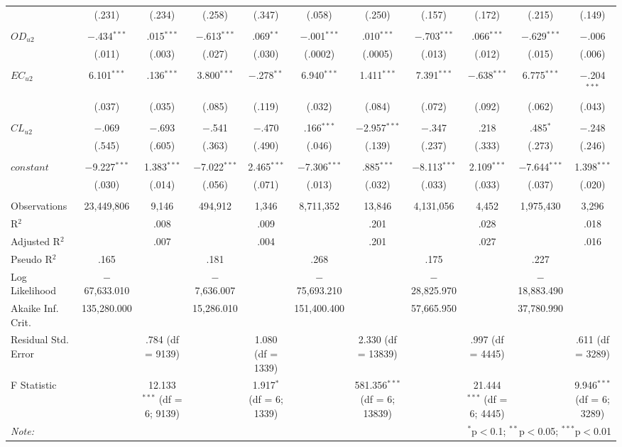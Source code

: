\begin{sidewaystable}[!htbp]
{\begin{tabular}{@{\extracolsep{0pt}}l|cc|cc|cc|cc|cc}
  & (.231) & (.234) & (.258) & (.347) & (.058) & (.250) & (.157) & (.172) & (.215) & (.149) \\
  & & & & & & & & & & \\
 $OD_{u2}$ & $-$.434$^{***}$ & .015$^{***}$ & $-$.613$^{***}$ & .069$^{**}$ & $-$.001$^{***}$ & .010$^{***}$ & $-$.703$^{***}$ & .066$^{***}$ & $-$.629$^{***}$ & $-$.006 \\
  & (.011) & (.003) & (.027) & (.030) & (.0002) & (.0005) & (.013) & (.012) & (.015) & (.006) \\
  & & & & & & & & & & \\
 $EC_{u2}$ & 6.101$^{***}$ & .136$^{***}$ & 3.800$^{***}$ & $-$.278$^{**}$ & 6.940$^{***}$ & 1.411$^{***}$ & 7.391$^{***}$ & $-$.638$^{***}$ & 6.775$^{***}$ & $-$.204$^{***}$ \\
  & (.037) & (.035) & (.085) & (.119) & (.032) & (.084) & (.072) & (.092) & (.062) & (.043) \\
  & & & & & & & & & & \\
 $CL_{u2}$ & $-$.069 & $-$.693 & $-$.541 & $-$.470 & .166$^{***}$ & $-$2.957$^{***}$ & $-$.347 & .218 & .485$^{*}$ & $-$.248 \\
  & (.545) & (.605) & (.363) & (.490) & (.046) & (.139) & (.237) & (.333) & (.273) & (.246) \\
  & & & & & & & & & & \\
 $constant$ & $-$9.227$^{***}$ & 1.383$^{***}$ & $-$7.022$^{***}$ & 2.465$^{***}$ & $-$7.306$^{***}$ & .885$^{***}$ & $-$8.113$^{***}$ & 2.109$^{***}$ & $-$7.644$^{***}$ & 1.398$^{***}$ \\
  & (.030) & (.014) & (.056) & (.071) & (.013) & (.032) & (.033) & (.033) & (.037) & (.020) \\
  & & & & & & & & & & \\
  \hline
  Observations & 23,449,806 & 9,146 & 494,912 & 1,346 & 8,711,352 & 13,846 & 4,131,056 & 4,452 & 1,975,430 & 3,296 \\
  R$^{2}$ &  & .008 &  & .009 &  & .201 &  & .028 &  & .018 \\
  Adjusted R$^{2}$ &  & .007 &  & .004 &  & .201 &  & .027 &  & .016 \\
  Pseudo R$^{2}$  & .165 &  & .181 &  & .268 &  & .175 &  & .227 & \\
  Log Likelihood & $-$67,633.010 &  & $-$7,636.007 &  & $-$75,693.210 &  & $-$28,825.970 &  & $-$18,883.490 &  \\
  Akaike Inf. Crit. & 135,280.000 &  & 15,286.010 &  & 151,400.400 &  & 57,665.950 &  & 37,780.990 &  \\
  Residual Std. Error &  & .784 (df = 9139) &  & 1.080 (df = 1339) &  & 2.330 (df = 13839) &  & .997 (df = 4445) &  & .611 (df = 3289) \\
  F Statistic &  & 12.133$^{***}$ (df = 6; 9139) &  & 1.917$^{*}$ (df = 6; 1339) &  & 581.356$^{***}$ (df = 6; 13839) &  & 21.444$^{***}$ (df = 6; 4445) &  & 9.946$^{***}$ (df = 6; 3289) \\
  \hline
  \multicolumn{1}{l}{\textit{Note:}} & \multicolumn{10}{r}{$^{*}$p$<$0.1; $^{**}$p$<$0.05; $^{***}$p$<$0.01} \\
  \end{tabular}}
\end{sidewaystable}
\renewcommand{\arraystretch}{1.5}
